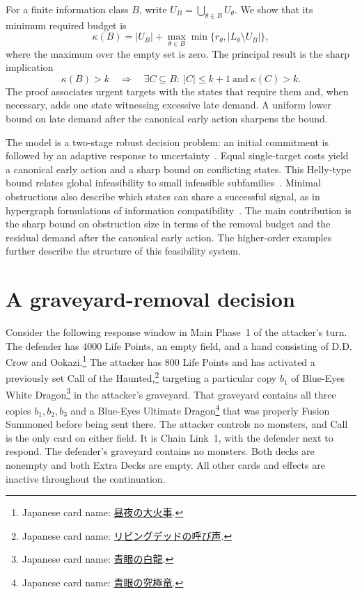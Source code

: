 \documentclass[11pt,a4paper]{amsart}
\newcommand{\jp}[1]{{\japanesefont #1}}
\theoremstyle{definition}
\theoremstyle{remark}
\newcommand{\card}[1]{\lvert #1\rvert}
\newcommand{\cardnote}[2]{\footnote{Japanese card name: \href{https://www.db.yugioh-card.com/yugiohdb/card_search.action?ope=2\&cid=#1\&request_locale=ja}{\jp{#2}}.}}
\begin{document}
For a finite information class $B$, write
$U_B=\bigcup_{\theta\in B}U_\theta$. We show that its minimum required budget is
\begin{equation}\label{eq:introthreshold}
 \kappa(B)=\card{U_B}+
 \max_{\theta\in B}\min\{r_\theta,\card{L_\theta\setminus U_B}\},
\end{equation}
where the maximum over the empty set is zero. The principal result is the
sharp implication
\[
 \kappa(B)>k\quad\Longrightarrow\quad
 \exists C\subseteq B:\ \card C\le k+1\ \text{and}\ \kappa(C)>k.
\]
The proof associates urgent targets with the states that require them and,
when necessary, adds one state witnessing excessive late demand. A uniform
lower bound on late demand after the canonical early action sharpens the bound.

The model is a two-stage robust decision problem: an initial commitment
is followed by an adaptive response to uncertainty~\cite{goerigk,kasperski}.
Equal single-target costs yield a canonical early action and a sharp bound on
conflicting states. This Helly-type bound relates global infeasibility to small
infeasible subfamilies~\cite{amenta,amentathesis,cardinal}. Minimal obstructions
also describe which states can share a successful signal, as in hypergraph
formulations of information compatibility~\cite{yuan}. The main contribution
is the sharp bound on obstruction size in terms of the removal budget and
the residual demand after the canonical early action. The higher-order
examples further describe the structure of this feasibility system.

\section{A graveyard-removal decision}\label{sec:cards}

Consider the following response window in Main Phase~1 of the attacker's turn.
The defender has $4000$ Life Points, an empty field, and a hand consisting of
D.D. Crow and Ookazi.\cardnote{4352}{昼夜の大火事}
The attacker has $800$ Life Points and has activated a previously set
Call of the Haunted,\cardnote{4989}{リビングデッドの呼び声}
targeting a particular copy $b_1$ of
Blue-Eyes White Dragon\cardnote{4007}{青眼の白龍}
in the attacker's graveyard. That graveyard contains all three copies
$b_1,b_2,b_3$ and a Blue-Eyes Ultimate Dragon\cardnote{4386}{青眼の究極竜}
that was properly Fusion Summoned before being sent there. The attacker
controls no monsters, and Call is the only card on either field. It is
Chain Link~1, with the defender next to respond. The defender's graveyard
contains no monsters. Both decks are nonempty and both Extra Decks are
empty. All other cards and effects are inactive throughout the continuation.
\end{document}
